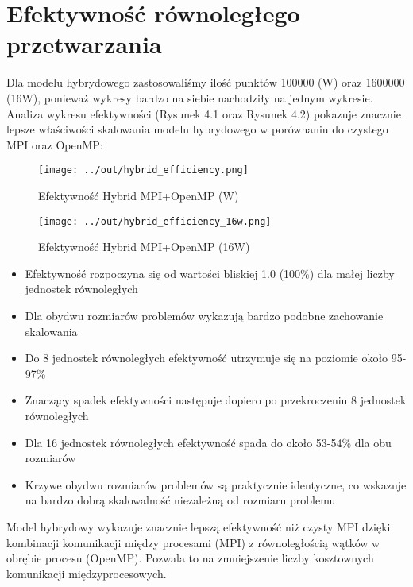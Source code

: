 \documentclass[12pt,a4paper]{report}
\begin{document}
\section{Efektywność równoległego przetwarzania}
Dla modelu hybrydowego zastosowaliśmy ilość punktów 100000 (W) oraz 1600000 (16W), ponieważ wykresy bardzo na siebie nachodziły na jednym wykresie. Analiza wykresu efektywności (Rysunek 4.1 oraz Rysunek 4.2) pokazuje znacznie lepsze właściwości skalowania modelu hybrydowego w porównaniu do czystego MPI oraz OpenMP:
\begin{figure}[h]
    \centering
    \texttt{[image: ../out/hybrid\_efficiency.png]}
    \caption{Efektywność Hybrid MPI+OpenMP (W)}
    \label{fig:hybrid_efficiency}
\end{figure}
\begin{figure}[h]
    \centering
    \texttt{[image: ../out/hybrid\_efficiency\_16w.png]}
    \caption{Efektywność Hybrid MPI+OpenMP (16W)}
    \label{fig:hybrid_efficiency_16w}
\end{figure}
\begin{itemize}
    \item Efektywność rozpoczyna się od wartości bliskiej 1.0 (100\%) dla małej liczby jednostek równoległych
    \item Dla obydwu rozmiarów problemów wykazują bardzo podobne zachowanie skalowania
    \item Do 8 jednostek równoległych efektywność utrzymuje się na poziomie około 95-97\%
    \item Znaczący spadek efektywności następuje dopiero po przekroczeniu 8 jednostek równoległych
    \item Dla 16 jednostek równoległych efektywność spada do około 53-54\% dla obu rozmiarów
    \item Krzywe obydwu rozmiarów problemów są praktycznie identyczne, co wskazuje na bardzo dobrą skalowalność niezależną od rozmiaru problemu
\end{itemize}

Model hybrydowy wykazuje znacznie lepszą efektywność niż czysty MPI dzięki kombinacji komunikacji między procesami (MPI) z równoległością wątków w obrębie procesu (OpenMP). Pozwala to na zmniejszenie liczby kosztownych komunikacji międzyprocesowych.
\end{document}
